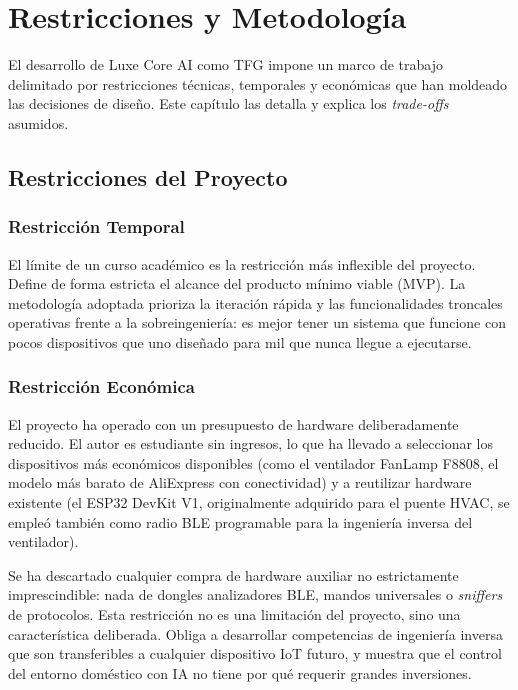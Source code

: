 \chapter{Restricciones y Metodología}
\label{cap:restricciones_metodologia}

El desarrollo de Luxe Core AI como TFG impone un marco de trabajo delimitado por restricciones técnicas, temporales y económicas que han moldeado las decisiones de diseño. Este capítulo las detalla y explica los \textit{trade-offs} asumidos.


\section{Restricciones del Proyecto}

\subsection{Restricción Temporal}

El límite de un curso académico es la restricción más inflexible del proyecto. Define de forma estricta el alcance del producto mínimo viable (MVP). La metodología adoptada prioriza la iteración rápida y las funcionalidades troncales operativas frente a la sobreingeniería: es mejor tener un sistema que funcione con pocos dispositivos que uno diseñado para mil que nunca llegue a ejecutarse.

\subsection{Restricción Económica}

El proyecto ha operado con un presupuesto de hardware deliberadamente reducido. El autor es estudiante sin ingresos, lo que ha llevado a seleccionar los dispositivos más económicos disponibles (como el ventilador FanLamp F8808, el modelo más barato de AliExpress con conectividad) y a reutilizar hardware existente (el ESP32 DevKit V1, originalmente adquirido para el puente HVAC, se empleó también como radio BLE programable para la ingeniería inversa del ventilador).

Se ha descartado cualquier compra de hardware auxiliar no estrictamente imprescindible: nada de dongles analizadores BLE, mandos universales o \textit{sniffers} de protocolos. Esta restricción no es una limitación del proyecto, sino una característica deliberada. Obliga a desarrollar competencias de ingeniería inversa que son transferibles a cualquier dispositivo IoT futuro, y muestra que el control del entorno doméstico con IA no tiene por qué requerir grandes inversiones.


